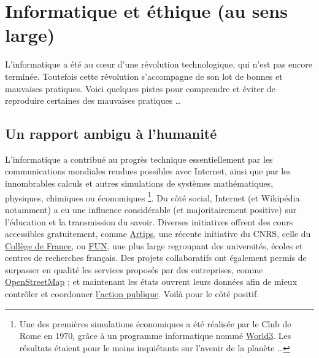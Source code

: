 \documentclass[10pt]{article}
\begin{document}
\section{Informatique et éthique (au sens large)}

L'informatique a été au cœur d'une révolution technologique, qui n'est pas encore terminée.
Toutefois cette révolution s'accompagne de son lot de bonnes et mauvaises pratiques. Voici quelques pistes
pour comprendre et éviter de reproduire certaines des mauvaises pratiques \ldots


\subsection{Un rapport ambigu à l'humanité}

L'informatique a contribué au progrès technique essentiellement par les communications mondiales rendues possibles
avec Internet, ainsi que par les innombrables calculs et autres simulations de systèmes mathématiques, physiques, chimiques ou économiques \footnote{
  Une des premières simulations économiques a été réalisée par le Club de Rome en 1970, grâce à un programme informatique nommé
  \href{https://fr.wikipedia.org/wiki/World3}{World3}. Les résultats étaient pour le moins inquiétants sur l'avenir de la planète \ldots
}.
Du côté social, Internet (et Wikipédia notamment) a eu une influence considérable (et majoritairement positive) sur l'éducation
et la transmission du savoir. Diverses initiatives offrent des cours accessibles gratuitement, comme 
\href{https://cnrs.artips.fr/course}{Artips}, une récente initiative du CNRS,
celle du \href{https://www.college-de-france.fr/site/college/index.htm}{Collège de France}, ou 
\href{https://www.fun-mooc.fr/}{FUN}, une plus large regroupant des universités, écoles et centres de recherches français.
Des projets collaboratifs ont également permis de surpasser en qualité les services proposés par des entreprises,
comme \href{https://www.openstreetmap.org/}{OpenStreetMap} ;
et maintenant les états ouvrent leurs données afin de mieux contrôler et coordonner \href{https://www.data.gouv.fr/fr/}{l'action publique}.
Voilà pour le côté positif.
\end{document}
